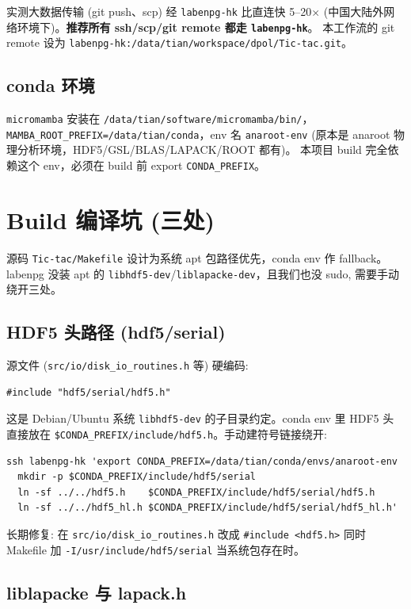 \documentclass[11pt,a4paper]{article}
\begin{document}
实测大数据传输 (git push、scp) 经 \texttt{labenpg-hk} 比直连快 5--20$\times$
(中国大陆外网络环境下)。\textbf{推荐所有 ssh/scp/git remote 都走 \texttt{labenpg-hk}}。
本工作流的 git remote 设为
\texttt{labenpg-hk:/data/tian/workspace/dpol/Tic-tac.git}。

\subsection{conda 环境}

\texttt{micromamba} 安装在 \texttt{/data/tian/software/micromamba/bin/}，
\texttt{MAMBA\_ROOT\_PREFIX=/data/tian/conda}，env 名 \texttt{anaroot-env}
(原本是 anaroot 物理分析环境，HDF5/GSL/BLAS/LAPACK/ROOT 都有)。
本项目 build 完全依赖这个 env，必须在 build 前 export \texttt{CONDA\_PREFIX}。

\section{Build 编译坑 (三处)}

源码 \texttt{Tic-tac/Makefile} 设计为系统 apt 包路径优先，conda env 作 fallback。
labenpg 没装 apt 的 \texttt{libhdf5-dev}/\texttt{liblapacke-dev}，且我们也没 sudo,
需要手动绕开三处。

\subsection{HDF5 头路径 (hdf5/serial)}

源文件 (\texttt{src/io/disk\_io\_routines.h} 等) 硬编码:
\begin{lstlisting}
#include "hdf5/serial/hdf5.h"
\end{lstlisting}
这是 Debian/Ubuntu 系统 \texttt{libhdf5-dev} 的子目录约定。conda env 里 HDF5 头
直接放在 \texttt{\$CONDA\_PREFIX/include/hdf5.h}。手动建符号链接绕开:

\begin{lstlisting}
ssh labenpg-hk 'export CONDA_PREFIX=/data/tian/conda/envs/anaroot-env
  mkdir -p $CONDA_PREFIX/include/hdf5/serial
  ln -sf ../../hdf5.h    $CONDA_PREFIX/include/hdf5/serial/hdf5.h
  ln -sf ../../hdf5_hl.h $CONDA_PREFIX/include/hdf5/serial/hdf5_hl.h'
\end{lstlisting}

长期修复: 在 \texttt{src/io/disk\_io\_routines.h} 改成
\verb|#include <hdf5.h>| 同时 Makefile 加 \texttt{-I/usr/include/hdf5/serial}
当系统包存在时。

\subsection{liblapacke 与 lapack.h}
\end{document}
